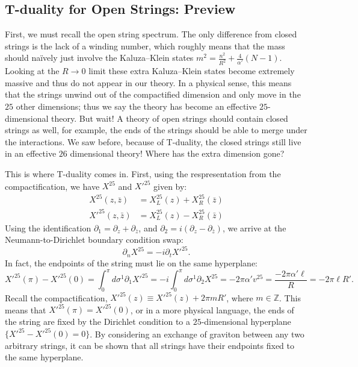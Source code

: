 \documentclass{report}
\theoremstyle{plain}
\theoremstyle{definition}
\theoremstyle{remark}
\newcommand{\FR}[2]{\frac{#1}{#2}}
\newcommand{\sg}{\sigma}
\newcommand{\di}{\partial}
\newcommand{\bZ}{\mathbb{Z}}
\begin{document}
\subsection{T-duality for Open Strings: Preview}
First, we must recall the open string spectrum. The only difference from
closed strings is the lack of a winding number, which roughly means that
the mass should na\"ively just involve the Kaluza--Klein states $m^2 =
\FR{n^2}{R^2}+\FR{4}{\alpha'}(N-1)$. Looking at the $R\to 0$ limit these
extra Kaluza--Klein states become extremely massive and thus do not appear
in our theory. In a physical sense, this means that the strings unwind out
of the compactified dimension and only move in the $25$ other dimensions;
thus we say the theory has become an effective $25$-dimensional theory. But
wait! A theory of open strings should contain closed strings as well, for
example, the ends of the strings should be able to merge under the
interactions. We saw before, because of T-duality, the closed strings still
live in an effective $26$ dimensional theory! Where has the extra dimension
gone?

This is where T-duality comes in. First, using the respresentation from the
compactification, we have $X^{25}$ and $X'^{25}$ given by:
\begin{align*}
X^{25}(z,\bar z)  &= X_L^{25}(z) + X_R^{25}(\bar z)\\
X'^{25}(z,\bar z) &= X_L^{25}(z) - X_R^{25}(\bar z)
\end{align*}
Using the identification $\di_1 = \di_z + \di_{\bar z}$, and $\di_2 =
i(\di_z-\di_{\bar z})$, we arrive at the Neumann-to-Dirichlet boundary
condition swap: \[\di_n X^{25} = -i\di_t X'^{25}.\]
In fact, the endpoints of the string must lie on the same hyperplane:
\[ X'^{25}(\pi) - X'^{25}(0) = \int_0^\pi d\sg^1\di_1 X'^{25}
= -i\int_0^\pi d\sg^1 \di_2 X^{25} = -2\pi\alpha' v^{25}
= \FR{-2\pi\alpha' \ell}{R} = -2\pi \ell R'.\]
Recall the compactification, $X'^{25}(z) \equiv X'^{25}(z) + 2\pi m R'$, where
$m\in\bZ$. This means that $X'^{25}(\pi) = X'^{25}(0)$, or in a more
physical language, the ends of the string are fixed by the Dirichlet
condition to a $25$-dimensional hyperplane $\{X'^{25} - X'^{25}(0) = 0\}$.
By considering an exchange of graviton between any two arbitrary strings,
it can be shown that all strings have their endpoints fixed to the same
hyperplane.
\end{document}
